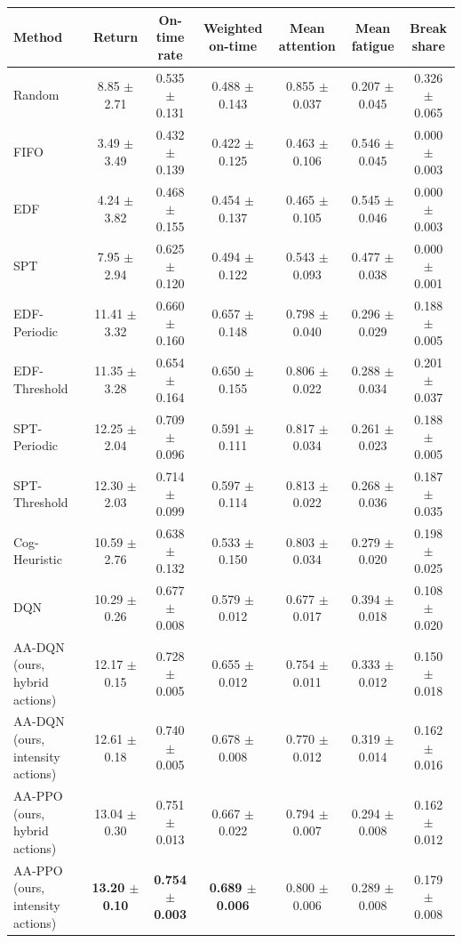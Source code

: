\begin{tabular}{lcccccc}
\toprule
Method & Return & On-time rate & Weighted on-time & Mean attention & Mean fatigue & Break share \\
\midrule
Random & 8.85 $\pm$ 2.71 & 0.535 $\pm$ 0.131 & 0.488 $\pm$ 0.143 & 0.855 $\pm$ 0.037 & 0.207 $\pm$ 0.045 & 0.326 $\pm$ 0.065 \\
FIFO & 3.49 $\pm$ 3.49 & 0.432 $\pm$ 0.139 & 0.422 $\pm$ 0.125 & 0.463 $\pm$ 0.106 & 0.546 $\pm$ 0.045 & 0.000 $\pm$ 0.003 \\
EDF & 4.24 $\pm$ 3.82 & 0.468 $\pm$ 0.155 & 0.454 $\pm$ 0.137 & 0.465 $\pm$ 0.105 & 0.545 $\pm$ 0.046 & 0.000 $\pm$ 0.003 \\
SPT & 7.95 $\pm$ 2.94 & 0.625 $\pm$ 0.120 & 0.494 $\pm$ 0.122 & 0.543 $\pm$ 0.093 & 0.477 $\pm$ 0.038 & 0.000 $\pm$ 0.001 \\
EDF-Periodic & 11.41 $\pm$ 3.32 & 0.660 $\pm$ 0.160 & 0.657 $\pm$ 0.148 & 0.798 $\pm$ 0.040 & 0.296 $\pm$ 0.029 & 0.188 $\pm$ 0.005 \\
EDF-Threshold & 11.35 $\pm$ 3.28 & 0.654 $\pm$ 0.164 & 0.650 $\pm$ 0.155 & 0.806 $\pm$ 0.022 & 0.288 $\pm$ 0.034 & 0.201 $\pm$ 0.037 \\
SPT-Periodic & 12.25 $\pm$ 2.04 & 0.709 $\pm$ 0.096 & 0.591 $\pm$ 0.111 & 0.817 $\pm$ 0.034 & 0.261 $\pm$ 0.023 & 0.188 $\pm$ 0.005 \\
SPT-Threshold & 12.30 $\pm$ 2.03 & 0.714 $\pm$ 0.099 & 0.597 $\pm$ 0.114 & 0.813 $\pm$ 0.022 & 0.268 $\pm$ 0.036 & 0.187 $\pm$ 0.035 \\
Cog-Heuristic & 10.59 $\pm$ 2.76 & 0.638 $\pm$ 0.132 & 0.533 $\pm$ 0.150 & 0.803 $\pm$ 0.034 & 0.279 $\pm$ 0.020 & 0.198 $\pm$ 0.025 \\
\midrule
DQN & 10.29 $\pm$ 0.26 & 0.677 $\pm$ 0.008 & 0.579 $\pm$ 0.012 & 0.677 $\pm$ 0.017 & 0.394 $\pm$ 0.018 & 0.108 $\pm$ 0.020 \\
AA-DQN (ours, hybrid actions) & 12.17 $\pm$ 0.15 & 0.728 $\pm$ 0.005 & 0.655 $\pm$ 0.012 & 0.754 $\pm$ 0.011 & 0.333 $\pm$ 0.012 & 0.150 $\pm$ 0.018 \\
AA-DQN (ours, intensity actions) & 12.61 $\pm$ 0.18 & 0.740 $\pm$ 0.005 & 0.678 $\pm$ 0.008 & 0.770 $\pm$ 0.012 & 0.319 $\pm$ 0.014 & 0.162 $\pm$ 0.016 \\
AA-PPO (ours, hybrid actions) & 13.04 $\pm$ 0.30 & 0.751 $\pm$ 0.013 & 0.667 $\pm$ 0.022 & 0.794 $\pm$ 0.007 & 0.294 $\pm$ 0.008 & 0.162 $\pm$ 0.012 \\
AA-PPO (ours, intensity actions) & \textbf{13.20 $\pm$ 0.10} & \textbf{0.754 $\pm$ 0.003} & \textbf{0.689 $\pm$ 0.006} & 0.800 $\pm$ 0.006 & 0.289 $\pm$ 0.008 & 0.179 $\pm$ 0.008 \\
\bottomrule
\end{tabular}